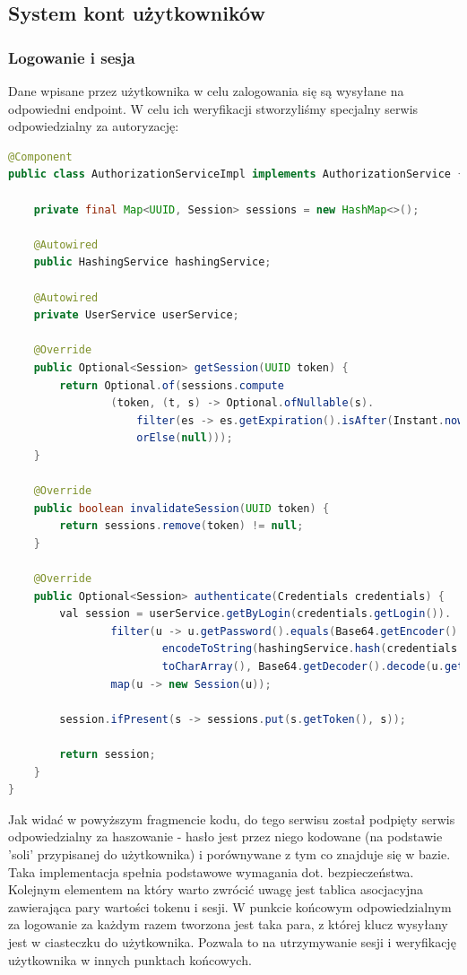 \documentclass{report}
\begin{document}
		\subsection{System kont użytkowników}
		
			\subsubsection{Logowanie i sesja}

			Dane wpisane przez użytkownika w celu zalogowania się są wysyłane na odpowiedni endpoint. W celu ich weryfikacji stworzyliśmy specjalny serwis odpowiedzialny za autoryzację:

\begin{lstlisting}[language=Java, breaklines]		
@Component
public class AuthorizationServiceImpl implements AuthorizationService {

    private final Map<UUID, Session> sessions = new HashMap<>();

    @Autowired
    public HashingService hashingService;

    @Autowired
    private UserService userService;

    @Override
    public Optional<Session> getSession(UUID token) {
        return Optional.of(sessions.compute
        		(token, (t, s) -> Optional.ofNullable(s).
                    filter(es -> es.getExpiration().isAfter(Instant.now())).
                    orElse(null)));
    }

    @Override
    public boolean invalidateSession(UUID token) {
        return sessions.remove(token) != null;
    }

    @Override
    public Optional<Session> authenticate(Credentials credentials) {
        val session = userService.getByLogin(credentials.getLogin()).
                filter(u -> u.getPassword().equals(Base64.getEncoder().
                        encodeToString(hashingService.hash(credentials.getPassword().
                        toCharArray(), Base64.getDecoder().decode(u.getSalt()))))).
                map(u -> new Session(u));

        session.ifPresent(s -> sessions.put(s.getToken(), s));

        return session;
    }
}	
\end{lstlisting}

Jak widać w powyższym fragmencie kodu, do tego serwisu został podpięty serwis odpowiedzialny za haszowanie - hasło jest przez niego kodowane (na podstawie 'soli' przypisanej do użytkownika) i porównywane z tym co znajduje się w bazie. Taka implementacja spełnia podstawowe wymagania dot. bezpieczeństwa. Kolejnym elementem na który warto zwrócić uwagę jest tablica asocjacyjna zawierająca pary wartości tokenu i sesji. W punkcie końcowym odpowiedzialnym za logowanie za każdym razem tworzona jest taka para, z której klucz wysyłany jest w ciasteczku do użytkownika. Pozwala to na utrzymywanie sesji i weryfikację użytkownika w innych punktach końcowych.
			
\end{document}
